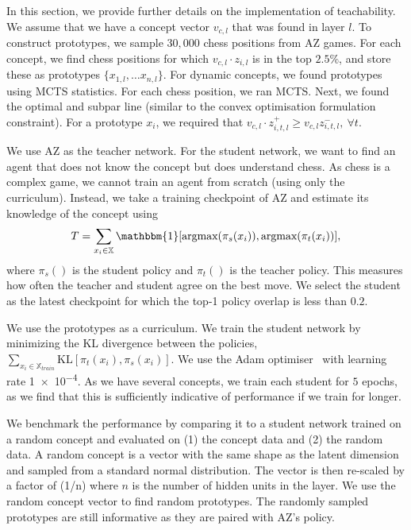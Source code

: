 \documentclass{article}
\def\Xset{\mathbb{X}}
\def\vcld{v_{c,l}\cdot}
\def\vcl{v_{c,l}}
\begin{document}
In this section, we provide further details on the implementation of teachability. We assume that we have a concept vector $\vcl$ that was found in layer $l$. To construct prototypes, we sample $30,000$ chess positions from AZ games. For each concept, we find chess positions for which $\vcld z_{i,l}$ is in the top $2.5 \%$, and store these as prototypes $ \{ x_{1,l}, \dots x_{n,l} \}$. 
For dynamic concepts, we found prototypes using MCTS statistics. For each chess position, we ran MCTS. Next, we found the optimal and subpar line (similar to the convex optimisation formulation constraint). For a prototype $x_i$, we required that  $v_{c,l}\cdot z^{+}_{i,t,l} \geq v_{c,l}z^{-}_{i,t,l}, \ \forall t$.

We use AZ as the teacher network. For the student network, we want to find an agent that does not know the concept but does understand chess. As chess is a complex game, we cannot train an agent from scratch (using only the curriculum). Instead, we take a training checkpoint of AZ and estimate its knowledge of the concept using
\begin{equation} 
   T =  \sum_{x_i \in \Xset} \mathbbm{1} [ \text{argmax}(\pi_s(x_i)), \text{argmax}(\pi_t(x_i)) ],
\end{equation}
where $\pi_s()$ is the student policy and $\pi_t()$ is the teacher policy. This measures how often the teacher and student agree on the best move. We select the student as the latest checkpoint for which the top-1 policy overlap is less than $0.2$.  

We use the prototypes as a curriculum. We train the student network by minimizing the KL divergence between the policies, $\sum_{x_i \in \Xset_{train}} \text{KL}[\pi_t(x_i), \pi_s(x_i)]$. 
We use the Adam optimiser~\citep{kingma2014adam} with learning rate \num{1e-4}. As we have several concepts, we train each student for $5$ epochs, as we find that this is sufficiently indicative of performance if we train for longer. 

We benchmark the performance by comparing it to a student network trained on a random concept and evaluated on (1) the concept data and (2) the random data. 
A random concept is a vector with the same shape as the latent dimension and sampled from a standard normal distribution.  The vector is then re-scaled by a factor of (1/n) where $n$ is the number of hidden units in the layer. 
We use the random concept vector to find random prototypes. The randomly sampled prototypes are still informative as they are paired with AZ's policy. 
\end{document}
